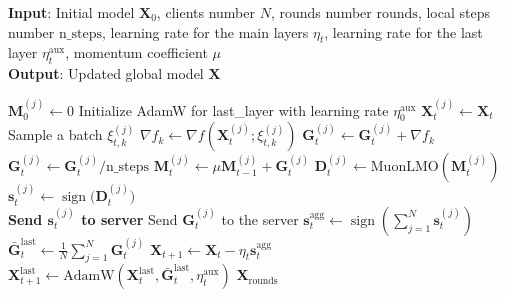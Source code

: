 \documentclass[letterpaper]{article} %
\begin{document}
\begin{algorithm}[!t]
\caption{Federated SignMuon}
\label{fed_alg}
\textbf{Input}: Initial model $\mathbf{X}_0$, clients number $N$, rounds number $\mathrm{rounds}$, local steps number $\mathrm{n\_steps}$, learning rate for the main layers $\eta_t$, learning rate for the last layer $\eta_t^{\text{aux}}$, momentum coefficient $\mu$ \\
\textbf{Output}: Updated global model $\mathbf{X}$
\begin{algorithmic}[1]
 \State $\mathbf{M}_0^{(j)} \gets 0$ 
\EndFor
\State Initialize AdamW for last\_layer with learning rate $\eta^{\mathrm{aux}}_0$
        \State $\mathbf{X}_t^{(j)} \gets \mathbf{X}_t$ 
            \State Sample a batch $\xi_{t,k}^{(j)}$
            \State $\nabla f_k \gets \nabla f(\mathbf{X}_t^{(j)}; \xi_{t,k}^{(j)})$
            \State $\mathbf{G}_t^{(j)} \gets \mathbf{G}_t^{(j)} + \nabla f_k$
        \EndFor
        \\ \State $\mathbf{G}_t^{(j)} \gets \mathbf{G}_t^{(j)} / \mathrm{n\_steps}$ 
        \State $\mathbf{M}_t^{(j)} \gets \mu \mathbf{M}_{t-1}^{(j)} + \mathbf{G}_t^{(j)}$ 
        \State $\mathbf{D}_t^{(j)} \gets \mathrm{MuonLMO}(\mathbf{M}_t^{(j)})$ 
        \State $\mathbf{s}_t^{(j)} \gets \operatorname{sign}\bigl(\mathbf{D}_t^{(j)}\bigr)$ 
        \\\State \textbf{Send $\mathbf{s}_t^{(j)}$ to server} 
          \State Send $\mathbf{G}_t^{(j)}$ to the server 
        \EndFor
      \EndFor
      \State $\mathbf{s}_t^{\mathrm{agg}} \gets \operatorname{sign}\!\left(\sum_{j=1}^{N} \mathbf{s}_t^{(j)}\right)$ 
      \State $\bar{\mathbf{G}}_t^{\text{last}} \gets \frac{1}{N}\sum_{j=1}^{N} \mathbf{G}_t^{(j)}$ 
      \State $\mathbf{X}_{t+1} \gets \mathbf{X}_t - \eta_t \mathbf{s}_t^{\mathrm{agg}}$ 
      \\ \State $\mathbf{X}_{t+1}^{\text{last}} \gets \text{AdamW}(\mathbf{X}_t^{\text{last}}, \bar{\mathbf{G}}_t^{\text{last}}, \eta_t^{\text{aux}})$ 
\EndFor
\State \Return $\mathbf{X}_{\mathrm{rounds}}$
\end{algorithmic}
\end{algorithm}
\end{document}
